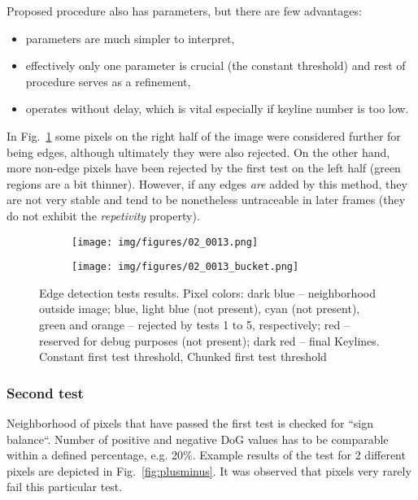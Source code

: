 Proposed procedure also has parameters, but there are few advantages:
\begin{itemize}
	\item parameters are much simpler to interpret,
	\item effectively only one parameter is crucial (the constant threshold) and rest of procedure serves as a refinement,
	\item operates without delay, which is vital especially if keyline number is too low.
\end{itemize}

In Fig.~\ref{fig:bucket} some pixels on the right half of the image were considered further for being edges, although ultimately they were also rejected. On the other hand, more non-edge pixels have been rejected by the first test on the left half (green regions are a bit thinner). However, if any edges \textit{are} added by this method, they are not very stable and tend to be nonetheless untraceable in later frames (they do not exhibit the \textit{repetivity} property).

\begin{figure}[ht]
	\centering
	\begin{subfigure}{1\textwidth}
		\centering
		\centering\texttt{[image: img/figures/02\_0013.png]}
		\subcaption{\label{fig:bucket_a}}
	\end{subfigure}
	\begin{subfigure}{1\textwidth}
		\centering
		\centering\texttt{[image: img/figures/02\_0013\_bucket.png]}
		\subcaption{\label{fig:bucket_b}}
	\end{subfigure}
	\caption{\label{fig:bucket} Edge detection tests results. Pixel colors: dark blue -- neighborhood outside image; blue, light blue (not present), cyan (not present), green and orange -- rejected by tests 1 to 5, respectively; red -- reserved for debug purposes (not present); dark red -- final Keylines. \protect{} Constant first test threshold,
		\protect{} Chunked first test threshold}
\end{figure}

\subsubsection{Second test}
\label{edge_second}

Neighborhood of pixels that have passed the first test is checked for ``sign balance``. Number of positive and negative DoG values has to be comparable within a defined percentage, e.g. 20\%. Example results of the test for 2 different pixels are depicted in Fig.~\ref{fig:plusminus}. It was observed that pixels very rarely fail this particular test.

